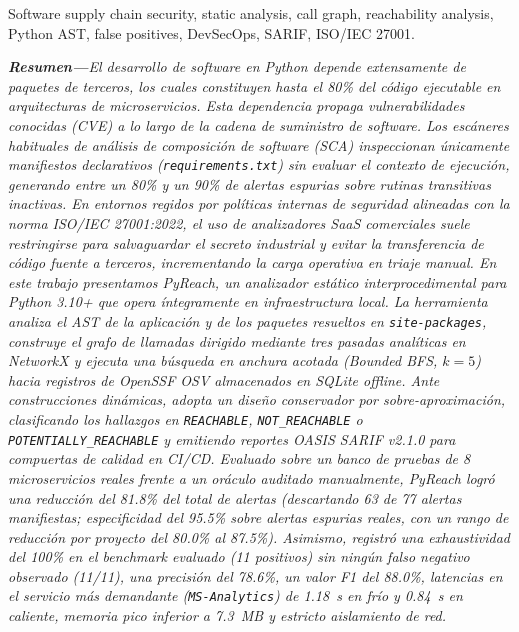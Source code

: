 \documentclass[conference]{IEEEtran}
\begin{document}
\begin{IEEEkeywords}
Software supply chain security, static analysis, call graph, reachability analysis, Python AST, false positives, DevSecOps, SARIF, ISO/IEC 27001.
\end{IEEEkeywords}

\vspace{0.15cm}
\noindent\textbf{\textit{Resumen---}}\textit{El desarrollo de software en Python depende extensamente de paquetes de terceros, los cuales constituyen hasta el 80\% del código ejecutable en arquitecturas de microservicios. Esta dependencia propaga vulnerabilidades conocidas (CVE) a lo largo de la cadena de suministro de software. Los escáneres habituales de análisis de composición de software (SCA) inspeccionan únicamente manifiestos declarativos (\texttt{requirements.txt}) sin evaluar el contexto de ejecución, generando entre un 80\% y un 90\% de alertas espurias sobre rutinas transitivas inactivas. En entornos regidos por políticas internas de seguridad alineadas con la norma ISO/IEC 27001:2022, el uso de analizadores SaaS comerciales suele restringirse para salvaguardar el secreto industrial y evitar la transferencia de código fuente a terceros, incrementando la carga operativa en triaje manual. En este trabajo presentamos \textit{PyReach}, un analizador estático interprocedimental para Python 3.10+ que opera íntegramente en infraestructura local. La herramienta analiza el AST de la aplicación y de los paquetes resueltos en \texttt{site-packages}, construye el grafo de llamadas dirigido mediante tres pasadas analíticas en NetworkX y ejecuta una búsqueda en anchura acotada (Bounded BFS, $k=5$) hacia registros de OpenSSF OSV almacenados en SQLite offline. Ante construcciones dinámicas, adopta un diseño conservador por sobre-aproximación, clasificando los hallazgos en \texttt{REACHABLE}, \texttt{NOT\_REACHABLE} o \texttt{POTENTIALLY\_REACHABLE} y emitiendo reportes OASIS SARIF v2.1.0 para compuertas de calidad en CI/CD. Evaluado sobre un banco de pruebas de 8 microservicios reales frente a un oráculo auditado manualmente, \textit{PyReach} logró una reducción del 81.8\% del total de alertas (descartando 63 de 77 alertas manifiestas; especificidad del 95.5\% sobre alertas espurias reales, con un rango de reducción por proyecto del 80.0\% al 87.5\%). Asimismo, registró una exhaustividad del 100\% en el benchmark evaluado (11 positivos) sin ningún falso negativo observado (11/11), una precisión del 78.6\%, un valor F1 del 88.0\%, latencias en el servicio más demandante (\texttt{MS-Analytics}) de 1.18~s en frío y 0.84~s en caliente, memoria pico inferior a 7.3~MB y estricto aislamiento de red.}
\end{document}
